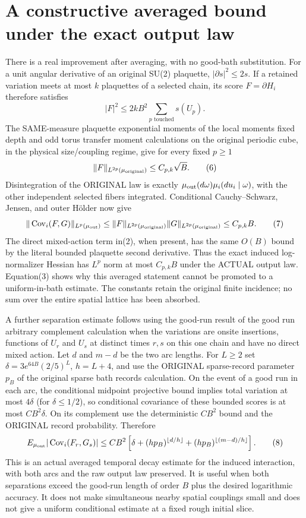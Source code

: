 \documentclass{article}
\begin{document}
\section*{A constructive averaged bound under the exact output law}
There is a real improvement after averaging, with no good-bath substitution. For a unit angular derivative of an original SU(2) plaquette, $|\partial s|^2\le2s$. If a retained variation meets at most $k$ plaquettes of a selected chain, its score $F=\partial H_i$ therefore satisfies
\[
 |F|^2\le2k B^2\sum_{p\text{ touched}}s(U_p).
\]
The SAME-measure plaquette exponential moments of the local moments fixed depth and odd torus transfer moment calculations on the original periodic cube, in the physical size/coupling regime, give for every fixed $p\ge1$
\[
 \|F\|_{L^{2p}(\mu_{\rm original})}\le C_{p,k}\sqrt B. \tag{6}
\]
Disintegration of the ORIGINAL law is exactly $\mu_{\rm out}(d\omega)\mu_i(du_i\mid\omega)$, with the other independent selected fibers integrated. Conditional Cauchy--Schwarz, Jensen, and outer H\"older now give
\[
 \|\operatorname{Cov}_i(F,G)\|_{L^p(\mu_{\rm out})}
 \le \|F\|_{L^{2p}(\mu_{\rm original})}
       \|G\|_{L^{2p}(\mu_{\rm original})}
 \le C_{p,k}B.                                       \tag{7}
\]
The direct mixed-action term in(2), when present, has the same $O(B)$ bound by the literal bounded plaquette second derivative. Thus the exact induced log-normalizer Hessian has $L^p$ norm at most $C_{p,k}B$ under the ACTUAL output law. Equation(3) shows why this averaged statement cannot be promoted to a uniform-in-bath estimate. The constants retain the original finite incidence; no sum over the entire spatial lattice has been absorbed.

A further separation estimate follows using the good-run result of the good run arbitrary complement calculation when the variations are onsite insertions, functions of $U_r$ and $U_s$ at distinct times $r,s$ on this one chain and have no direct mixed action. Let $d$ and $m-d$ be the two arc lengths. For $L\ge2$ set $\delta=3e^{64B}(2/5)^L$, $h=L+4$, and use the ORIGINAL sparse-record parameter $p_B$ of the original sparse bath records calculation. On the event of a good run in each arc, the conditional midpoint projective bound implies total variation at most $4\delta$ (for $\delta\le1/2$), so conditional covariance of these bounded scores is at most $CB^2\delta$. On its complement use the deterministic $CB^2$ bound and the ORIGINAL record probability. Therefore
\[
 E_{\mu_{\rm out}}|\operatorname{Cov}_i(F_r,G_s)|
 \le CB^2\left[\delta+(hp_B)^{\lfloor d/h\rfloor}
                       +(hp_B)^{\lfloor(m-d)/h\rfloor}\right].          \tag{8}
\]
This is an actual averaged temporal decay estimate for the induced interaction, with both arcs and the raw output law preserved. It is useful when both separations exceed the good-run length of order $B$ plus the desired logarithmic accuracy. It does not make simultaneous nearby spatial couplings small and does not give a uniform conditional estimate at a fixed rough initial slice.
\end{document}
